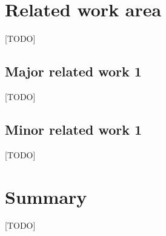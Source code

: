 \section{Related work area}
[TODO]

\subsection{Major related work 1}
[TODO]

\subsection{Minor related work 1}
[TODO]

\section{Summary}

[TODO]